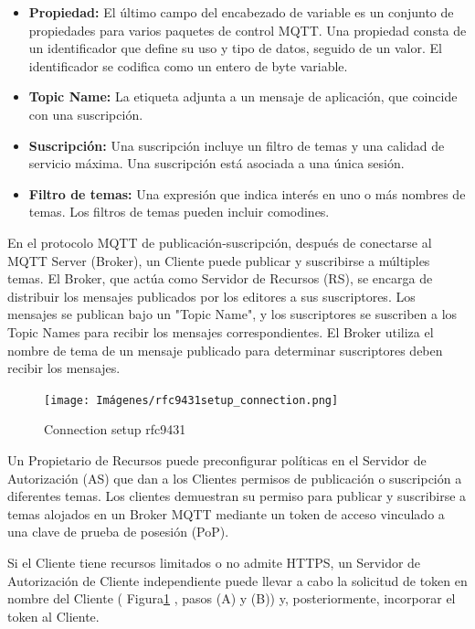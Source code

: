 \begin{itemize}
    \item \textbf{Propiedad: }El último campo del encabezado de variable es un conjunto de propiedades para varios paquetes de control MQTT. Una propiedad consta de un identificador que define su uso y tipo de datos, seguido de un valor. El identificador se codifica como un entero de byte variable.
    \item \textbf{Topic Name: }La etiqueta adjunta a un mensaje de aplicación, que coincide con una suscripción.
    \item \textbf{Suscripción: }Una suscripción incluye un filtro de temas y una calidad de servicio máxima. Una suscripción está asociada a una única sesión.
    \item \textbf{Filtro de temas: }Una expresión que indica interés en uno o más nombres de temas. Los filtros de temas pueden incluir comodines.
\end{itemize}


En el protocolo MQTT de publicación-suscripción, después de conectarse al MQTT Server (Broker), un Cliente puede publicar y suscribirse a múltiples temas.  El Broker, que actúa como Servidor de Recursos (RS), se encarga de distribuir los mensajes publicados por los editores a sus suscriptores.
Los mensajes se publican bajo un "Topic Name", y los suscriptores se suscriben a los Topic Names para recibir los mensajes correspondientes.  El Broker utiliza el nombre de tema de un mensaje publicado para determinar suscriptores deben recibir los mensajes. 

\begin{figure} %
    \centering
    \texttt{[image: Imágenes/rfc9431setup\_connection.png]}
    \caption{Connection setup rfc9431}
    \label{fig:setup_MQTT}
\end{figure}

Un Propietario de Recursos puede preconfigurar políticas en el Servidor de Autorización (AS) que dan a los Clientes permisos de publicación o suscripción a diferentes temas.
Los clientes demuestran su permiso para publicar y suscribirse a temas alojados en un Broker MQTT mediante un token de acceso vinculado a una clave de prueba de posesión (PoP).

Si el Cliente tiene recursos limitados o no admite HTTPS, un Servidor de Autorización de Cliente independiente puede llevar a cabo la solicitud de token en nombre del Cliente ( Figura\ref{fig:setup_MQTT} , pasos (A) y (B)) y, posteriormente, incorporar el token al Cliente.\cite{rfc9431}

